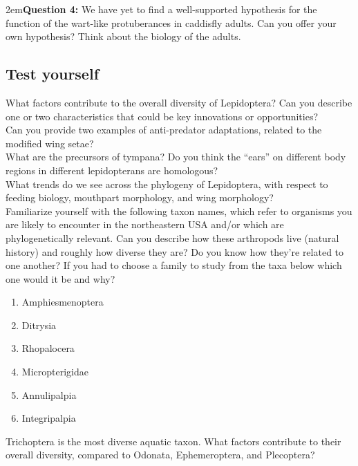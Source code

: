 \documentclass[letterpaper, 11pt]{article}
\begin{document}
\hangindent2em\textbf{Question 4:} We have yet to find a well-supported hypothesis for the function of the wart-like protuberances in caddisfly adults. Can you offer your own hypothesis? Think about the biology of the adults.

\FloatBarrier

\subsection*{Test yourself}
\noindent{}What factors contribute to the overall diversity of Lepidoptera? Can you describe one or two characteristics that could be key innovations or opportunities? \\

\noindent{}Can you provide two examples of anti-predator adaptations, related to the modified wing setae? \\

\noindent{}What are the precursors of tympana? Do you think the ``ears'' on different body regions in different lepidopterans are homologous? \\ 

\noindent{}What trends do we see across the phylogeny of Lepidoptera, with respect to feeding biology, mouthpart morphology, and wing morphology? \\

\noindent{}Familiarize yourself with the following taxon names, which refer to organisms you are likely to encounter in the northeastern USA and/or which are phylogenetically relevant. Can you describe how these arthropods live (natural history) and roughly how diverse they are? Do you know how they're related to one another? If you had to choose a family to study from the taxa below which one would it be and why?

\begin{enumerate} 
\item Amphiesmenoptera
\item Ditrysia
\item Rhopalocera
\item Micropterigidae
\item Annulipalpia
\item Integripalpia
\end{enumerate}

\noindent{}Trichoptera is the most diverse aquatic taxon. What factors contribute to their overall diversity, compared to Odonata, Ephemeroptera, and Plecoptera?\\
\end{document}
